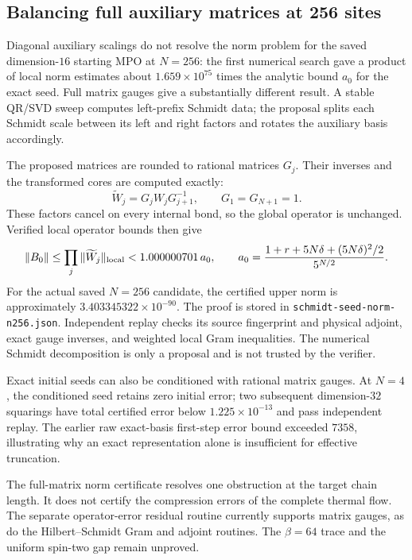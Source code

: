 \documentclass[11pt]{article}
\begin{document}
\subsection{Balancing full auxiliary matrices at 256 sites}
Diagonal auxiliary scalings do not resolve the norm problem for the
saved dimension-$16$ starting MPO at $N=256$: the first numerical search
gave a product of local norm estimates about $1.659\times10^{75}$ times
the analytic bound $a_0$ for the exact seed. Full matrix gauges give a
substantially different result. A stable QR/SVD sweep computes left-prefix
Schmidt data; the proposal splits each Schmidt scale between its left
and right factors and rotates the auxiliary basis accordingly.

The proposed matrices are rounded to rational matrices $G_j$. Their
inverses and the transformed cores are computed exactly:
\[
 \widetilde W_j=G_jW_jG_{j+1}^{-1},\qquad G_1=G_{N+1}=1.
\]
These factors cancel on every internal bond, so the global operator is
unchanged. Verified local operator bounds then give
\[
 \|B_0\|\le\prod_j\|\widetilde W_j\|_{\rm local}
 <1.000000701\,a_0,
 \qquad
 a_0=\frac{1+r+5N\delta+(5N\delta)^2/2}{5^{N/2}}.
\]
For the actual saved $N=256$ candidate, the certified upper norm is
approximately $3.403345322\times10^{-90}$. The proof is stored in
\texttt{schmidt-seed-norm-n256.json}. Independent replay checks its
source fingerprint and physical adjoint, exact gauge inverses, and
weighted local Gram inequalities. The numerical Schmidt decomposition
is only a proposal and is not trusted by the verifier.

Exact initial seeds can also be conditioned with rational matrix gauges.
At $N=4$, the conditioned seed retains zero initial error; two subsequent
dimension-$32$ squarings have total certified error below
$1.225\times10^{-13}$ and pass independent replay. The earlier raw
exact-basis first-step error bound exceeded $7358$, illustrating why an
exact representation alone is insufficient for effective truncation.

The full-matrix norm certificate resolves one obstruction at the target
chain length. It does not certify the compression errors of the complete
thermal flow. The separate operator-error residual routine currently
supports matrix gauges, as do the Hilbert--Schmidt Gram and adjoint routines.
The $\beta=64$ trace and the uniform spin-two gap remain
unproved.
\end{document}
